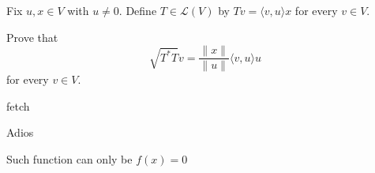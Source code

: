 \documentclass{scrartcl}
\begin{document}
\begin{problem}
  Fix $u,x \in V$ with $u \ne 0$. Define $T \in \mathcal{L}(V)$ by $Tv = \langle v,u\rangle x$ for every $v \in V$.

  Prove that
  \[
  \sqrt{T^*T}v = \frac{\|x\|}{\|u\|}\langle v,u\rangle u
  \]
  for every $v \in V$.
\end{problem}
\begin{answer*}
  fetch

Adios
\end{answer*}
\begin{claim*}
  Such function can only be $f(x) = 0$
\end{claim*}
\end{document}
